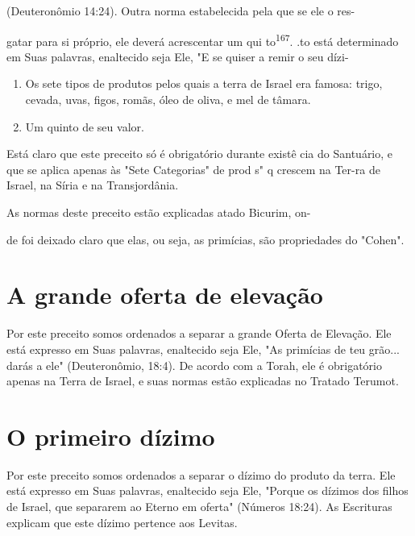 \begin{itemize}
\begin{enumrate}
\begin{itemize}
\begin{itemize}
\begin{itemize}
(Deuteronômio 14:24). Outra norma estabelecida pela que se ele o res-

gatar para si próprio, ele deverá acrescentar um qui
to\textsuperscript{167}. .to está determinado
em Suas palavras, enaltecido seja Ele, "E se quiser a remir o seu
dízi-


\begin{enumerate}
\def\labelenumi{\arabic{enumi}.}
\setcounter{enumi}{165}
\item
 
 Os sete tipos de produtos pelos quais a terra de Israel era famosa:
 trigo, cevada, uvas, figos, romãs, óleo de oliva, e mel de tâmara.
 
\item
 
 Um quinto de seu valor.
 
\end{enumerate}




Está claro que este preceito só é obrigatório durante existê cia do
Santuário, e que se aplica apenas às "Sete Categorias" de prod s" q
crescem na Ter-ra de Israel, na Síria e na Transjordânia.

As normas deste preceito estão explicadas atado Bicurim, on-


de foi deixado claro que elas, ou seja, as primícias, são propriedades
do "Cohen".


\section{A grande oferta de elevação}

Por este preceito somos ordenados a separar a grande Oferta de
Ele­vação. Ele está expresso em Suas palavras, enaltecido seja Ele, "As
primícias de teu grão... darás a ele" (Deuteronômio, 18:4). De acordo
com a Torah, ele é obrigatório apenas na Terra de Israel, e suas normas
estão explicadas no Tra­tado Terumot.

\section{O primeiro dízimo}

Por este preceito somos ordenados a separar o dízimo do produto da
terra. Ele está expresso em Suas palavras, enaltecido seja Ele, "Porque
os dízimos dos filhos de Israel, que separarem ao Eterno em oferta"
(Números 18:24). As Escrituras explicam que este dízimo pertence aos
Levitas.


\end{itemize}
\end{itemize}
\end{itemize}
\end{enumrate}
\end{itemize}
